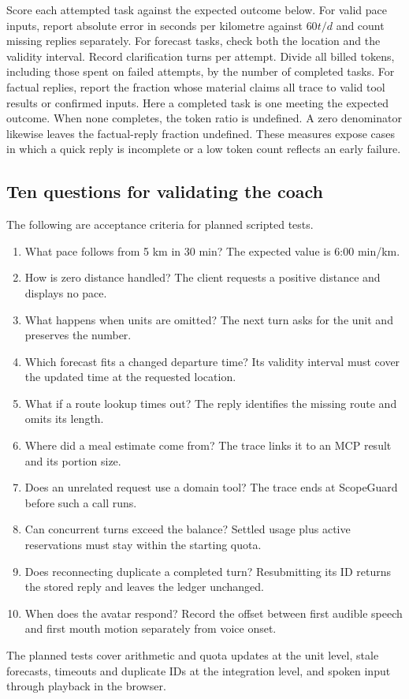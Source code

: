 \documentclass[conference]{IEEEtran}
\begin{document}
Score each attempted task against the expected outcome below. For valid pace inputs, report absolute error in seconds per kilometre against $60t/d$ and count missing replies separately. For forecast tasks, check both the location and the validity interval. Record clarification turns per attempt. Divide all billed tokens, including those spent on failed attempts, by the number of completed tasks. For factual replies, report the fraction whose material claims all trace to valid tool results or confirmed inputs. Here a completed task is one meeting the expected outcome. When none completes, the token ratio is undefined. A zero denominator likewise leaves the factual-reply fraction undefined. These measures expose cases in which a quick reply is incomplete or a low token count reflects an early failure.
\subsection{Ten questions for validating the coach}
The following are acceptance criteria for planned scripted tests.
\begin{enumerate}
\item What pace follows from 5 km in 30 min? The expected value is 6:00 min/km.
\item How is zero distance handled? The client requests a positive distance and displays no pace.
\item What happens when units are omitted? The next turn asks for the unit and preserves the number.
\item Which forecast fits a changed departure time? Its validity interval must cover the updated time at the requested location.
\item What if a route lookup times out? The reply identifies the missing route and omits its length.
\item Where did a meal estimate come from? The trace links it to an MCP result and its portion size.
\item Does an unrelated request use a domain tool? The trace ends at ScopeGuard before such a call runs.
\item Can concurrent turns exceed the balance? Settled usage plus active reservations must stay within the starting quota.
\item Does reconnecting duplicate a completed turn? Resubmitting its ID returns the stored reply and leaves the ledger unchanged.
\item When does the avatar respond? Record the offset between first audible speech and first mouth motion separately from voice onset.
\end{enumerate}
The planned tests cover arithmetic and quota updates at the unit level, stale forecasts, timeouts and duplicate IDs at the integration level, and spoken input through playback in the browser.
\end{document}
